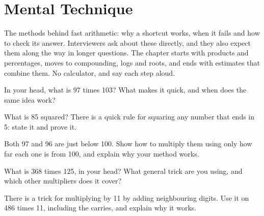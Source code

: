 \chapter{Mental Technique}\label{ch:iv1:mental-technique}

\begin{ivtrains}
The methods behind fast arithmetic: why a shortcut works, when it fails and how to check its answer. Interviewers ask about these directly, and they also expect them along the way in longer questions. The chapter starts with products and percentages, moves to compounding, logs and roots, and ends with estimates that combine them. No calculator, and say each step aloud.
\end{ivtrains}

\begin{question}\label{iq:iv1:mental-technique:1}
In your head, what is 97 times 103? What makes it quick, and when does the same idea work?
\end{question}

\begin{question}\label{iq:iv1:mental-technique:2}
What is 85 squared? There is a quick rule for squaring any number that ends in 5: state it and prove it.
\end{question}

\begin{question}\label{iq:iv1:mental-technique:3}
Both 97 and 96 are just below 100. Show how to multiply them using only how far each one is from 100, and explain why your method works.
\end{question}

\begin{question}\label{iq:iv1:mental-technique:4}
What is 368 times 125, in your head? What general trick are you using, and which other multipliers does it cover?
\end{question}

\begin{question}\label{iq:iv1:mental-technique:5}
There is a trick for multiplying by 11 by adding neighbouring digits. Use it on 486 times 11, including the carries, and explain why it works.
\end{question}

